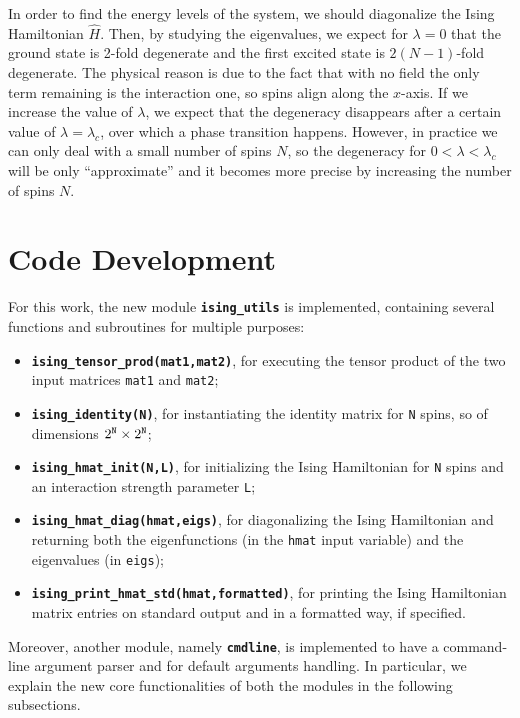 \documentclass[pra, onecolumn, notitlepage, floats, 11pt]{revtex4-1}
\newcommand{\codebold}[2][cobalt]{\texttt{\bfseries {\color{#1}#2}}}
\newcommand{\code}[2][black]{\color{#1}\texttt{#2}}
\newcommand{\codefunctionbold}[2]{\texttt{\bfseries {\color{cobalt}#1}({\color{lava}#2})}}
\begin{document}
In order to find the energy levels of the system, we should diagonalize the Ising Hamiltonian \( \hat{H} \). Then, by studying the eigenvalues, we expect for \( \lambda = 0 \) that the ground state is 2-fold degenerate and the first excited state is \( 2(N-1) \)-fold degenerate. The physical reason is due to the fact that with no field the only term remaining is the interaction one, so spins align along the \( x \)-axis. If we increase the value of \( \lambda \), we expect that the degeneracy disappears after a certain value of \( \lambda = \lambda_{c} \), over which a phase transition happens. However, in practice we can only deal with a small number of spins \( N \), so the degeneracy for \( 0 < \lambda < \lambda_{c} \) will be only ``approximate'' and it becomes more precise by increasing the number of spins \( N \).





\section{Code Development}
For this work, the new module \codebold{ising\_utils} is implemented, containing several functions and subroutines for multiple purposes:
\vspace{-5pt}
\begin{itemize}%
    \setlength\itemsep{-3pt}
    \item \codefunctionbold{ising\_tensor\_prod}{mat1,mat2}, for executing the tensor product of the two input matrices \code{mat1} and \code{mat2};
    \item \codefunctionbold{ising\_identity}{N}, for instantiating the identity matrix for \code{N} spins, so of dimensions \( 2^{\code{N}} \times 2^{\code{N}} \);
    \item \codefunctionbold{ising\_hmat\_init}{N,L}, for initializing the Ising Hamiltonian for \code{N} spins and an interaction strength parameter \code{L};
    \item \codefunctionbold{ising\_hmat\_diag}{hmat,eigs}, for diagonalizing the Ising Hamiltonian and returning both the eigenfunctions (in the \code{hmat} input variable) and the eigenvalues (in \code{eigs});
    \item \codefunctionbold{ising\_print\_hmat\_std}{hmat,formatted}, for printing the Ising Hamiltonian matrix entries on standard output and in a formatted way, if specified.
\end{itemize}

Moreover, another module, namely \codebold{cmdline}, is implemented to have a command-line argument parser and for default arguments handling. In particular, we explain the new core functionalities of both the modules in the following subsections.
\end{document}
